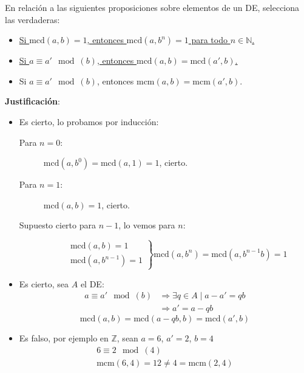\begin{ejercicio}
    En relación a las siguientes proposiciones sobre elementos de un DE, selecciona las verdaderas:
    \begin{itemize}
        \item \underline{Si $\text{mcd}(a,b)=1$, entonces $\text{mcd}(a,b^n)=1$ para todo $n \in \mathbb{N}$.}
        \item \underline{Si $a \equiv a'\mod(b)$, entonces $\text{mcd}(a,b)=\text{mcd}(a',b)$.}
        \item Si $a\equiv a'\mod(b)$, entonces $\text{mcm}(a,b)=\text{mcm}(a',b)$.
    \end{itemize}

    \noindent
    \textbf{Justificación}:
    \begin{itemize}
        \item Es cierto, lo probamos por inducción:
            \begin{description}
                \item [Para $n=0$:] 
                    $\text{mcd}(a,b^0) = \text{mcd}(a,1)=1$, cierto.
                \item [Para $n=1$:] 
                    $\text{mcd}(a,b)=1$, cierto.
                \item [Supuesto cierto para $n-1$, lo vemos para $n$:] 
                    \begin{equation*}
                        \left.\begin{array}{r}
                            \text{mcd}(a,b)=1 \\
                            \text{mcd}(a,b^{n-1}) = 1
                    \end{array}\right\} \text{mcd}(a,b^n) = \text{mcd}(a,b^{n-1}b) = 1
                    \end{equation*}
            \end{description}
        \item Es cierto, sea $A$ el DE:
            \begin{align*}
                a\equiv a'\mod(b) &\Longrightarrow \exists q\in A \mid a-a' = qb \\
                                  &\Longrightarrow  a'=a-qb
            \end{align*}
            \begin{equation*}
                \text{mcd}(a,b) = \text{mcd}(a-qb,b) = \text{mcd}(a',b)
            \end{equation*}
        \item Es falso, por ejemplo en $\mathbb{Z}$, sean $a=6$, $a' = 2$, $b = 4$
            \begin{gather*}
                6\equiv 2\mod (4) \\
                \text{mcm}(6,4) = 12 \neq 4 = \text{mcm}(2,4)
            \end{gather*}
    \end{itemize}
\end{ejercicio}

